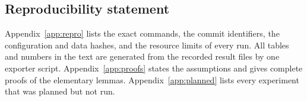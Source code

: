 \subsection*{Reproducibility statement}

Appendix~\ref{app:repro} lists the exact commands, the commit identifiers, the configuration and
data hashes, and the resource limits of every run. All tables and numbers in the text are
generated from the recorded result files by one exporter script. Appendix~\ref{app:proofs} states
the assumptions and gives complete proofs of the elementary lemmas. Appendix~\ref{app:planned}
lists every experiment that was planned but not run.
